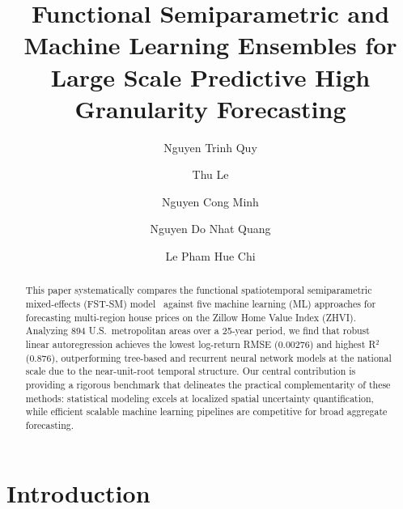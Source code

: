 \documentclass[runningheads]{llncs}
\begin{document}
\title{Functional Semiparametric and Machine Learning Ensembles for Large Scale Predictive High Granularity Forecasting}


\author{Nguyen Trinh Quy \and 
        Thu Le \and 
        Nguyen Cong Minh \and 
        Nguyen Do Nhat Quang \and 
        Le Pham Hue Chi}



\maketitle

\begin{abstract}
This paper systematically compares the functional spatiotemporal 
semiparametric mixed-effects (FST-SM) model~\cite{ref_fmem2023} 
against five machine learning (ML) approaches for forecasting multi-region 
house prices on the Zillow Home Value Index (ZHVI). Analyzing 894 U.S.\ 
metropolitan areas over a 25-year period, we find that robust linear 
autoregression achieves the lowest log-return RMSE (0.00276) and highest 
R$^2$ (0.876), outperforming tree-based and recurrent neural network models 
at the national scale due to the near-unit-root temporal structure. Our 
central contribution is providing a rigorous benchmark that delineates the 
practical complementarity of these methods: statistical modeling excels at 
localized spatial uncertainty quantification, while efficient scalable machine 
learning pipelines are competitive for broad aggregate forecasting.

\end{abstract}

\section{Introduction}
\label{sec:intro}
\end{document}
